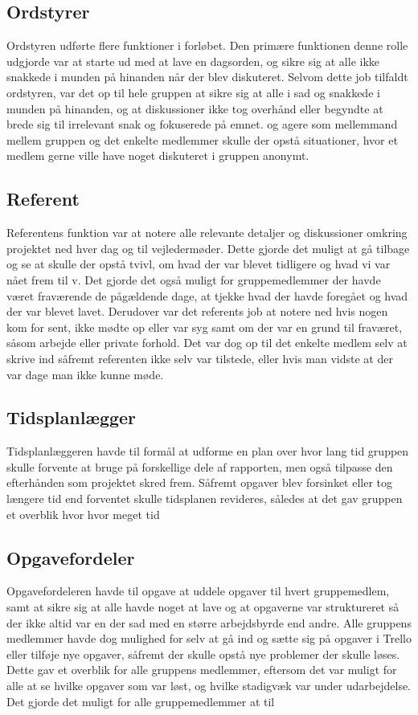 \subsection{Ordstyrer}\label{Ordstyrer-1}
Ordstyren udførte flere funktioner i forløbet. Den primære funktionen denne rolle udgjorde var at starte ud med at lave en dagsorden, og sikre sig at alle ikke snakkede i munden på hinanden når der blev diskuteret. Selvom dette job tilfaldt ordstyren, var det op til hele gruppen at sikre sig at alle i sad og snakkede i munden på hinanden, og at diskussioner ikke tog overhånd eller begyndte at brede sig til irrelevant snak og fokuserede på emnet.  og agere som mellemmand mellem gruppen og det enkelte medlemmer skulle der opstå situationer, hvor et medlem gerne ville have noget diskuteret i gruppen anonymt. 

\subsection{Referent}\label{Referent}
Referentens funktion var at notere alle relevante detaljer og diskussioner omkring projektet ned hver dag og til vejledermøder. Dette gjorde det muligt at gå tilbage og se  at skulle der opstå tvivl, om hvad der var blevet tidligere og hvad vi var nået frem til v. Det gjorde det også muligt for gruppemedlemmer der havde været fraværende de pågældende dage, at tjekke hvad der havde foregået og hvad der var blevet lavet. Derudover var det referents job at notere ned hvis nogen kom for sent, ikke mødte op eller var syg samt om der var en grund til fraværet, såsom arbejde eller private forhold. Det var dog op til det enkelte medlem selv at skrive ind såfremt referenten ikke selv var tilstede, eller hvis man vidste at der var dage man ikke kunne møde.  

\subsection{Tidsplanlægger}\label{Tidsplanlaegger}
Tidsplanlæggeren havde til formål at udforme en plan over hvor lang tid gruppen skulle forvente at bruge på forskellige dele af rapporten, men også tilpasse den efterhånden som projektet skred frem. Såfremt opgaver blev forsinket eller tog længere tid end forventet skulle tidsplanen revideres, således at det gav gruppen et overblik hvor hvor meget tid

\subsection{Opgavefordeler}\label{Opgavefordeler}
Opgavefordeleren havde til opgave at uddele opgaver til hvert gruppemedlem, samt at sikre sig at alle havde noget at lave og at opgaverne var struktureret så der ikke altid var en der sad med en større arbejdsbyrde end andre. Alle gruppens medlemmer havde dog mulighed for selv at gå ind og sætte sig på opgaver i Trello eller tilføje nye opgaver, såfremt der skulle opstå nye problemer der skulle løses. Dette gav et overblik for alle gruppens medlemmer, eftersom det var muligt for alle at se hvilke opgaver som var løst, og hvilke stadigvæk var under udarbejdelse. Det gjorde det muligt for alle gruppemedlemmer at til 

